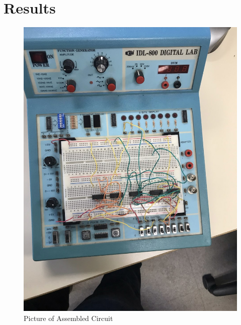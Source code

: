 \documentclass[11pt]{article}
\begin{document}
\section*{Results}

\begin{center}
	\begin{figure}
		\includegraphics[width=1\textwidth]{thumbnail_Image.jpg}
		\caption{Picture of Assembled Circuit}
	\end{figure}
\end{center}
\end{document}
